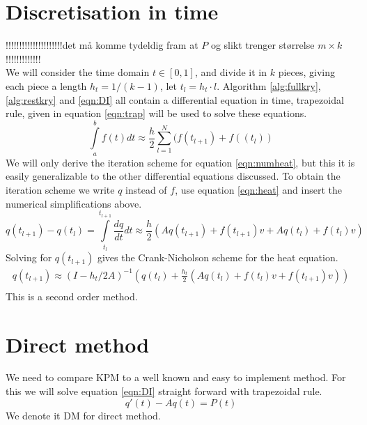 \section{Discretisation in time} \label{sec:time}
!!!!!!!!!!!!!!!!!!!!!det må komme tydeldig fram at $P$ og slikt trenger størrelse $m \times k$ !!!!!!!!!!!!!\\
We will consider the time domain $t \in [0,1] $, and divide it in $k$ pieces, giving each piece a length $h_t = 1/(k-1)$, let $t_l = h_t\cdot l$.
Algorithm \ref{alg:fullkry}, \ref{alg:restkry} and \ref{eqn:DI} all contain a differential equation in time,
trapezoidal rule\cite{trap}, given in equation \eqref{eqn:trap} will be used to solve these equations. 
\begin{equation} \label{eqn:trap}
\int \limits_a^b f(t) dt \approx \frac{h}{2} \sum \limits_{l = 1}^N(f(t_{l+1})+f((t_l))
\end{equation}
We will only derive the iteration scheme for equation \eqref{eqn:numheat}, but 
this it is easily generalizable to the other differential equations discussed.
To obtain the iteration scheme we write $q$ instead of $f$, use equation \eqref{eqn:heat} and insert the numerical simplifications above.
\begin{equation}
q(t_{l+1}) - q(t_l) = \int \limits_{t_l}^{t_{l+1}} \frac{d q}{d t} dt \approx \frac{h}{2}(A q(t_{l+1})+f(t_{l+1})v +A q(t_l)+f(t_l) v) 
\end{equation}
Solving for $q(t_{l+1})$ gives the Crank-Nicholson scheme for the heat equation.
\begin{equation} \label{eqn:trapscheme}
\begin{aligned}
q(t_{l+1}) \approx (I-h_t/2 A)^{-1}(q(t_l) + \frac{h_t}{2}( A q(t_{l}) + f(t_l)v+f(t_{l+1})v))\\
\end{aligned}
\end{equation} 
This is a second order method.
\section{Direct method} \label{sec:DM}
We need to compare KPM to a well known and easy to implement method. For this we will solve equation \eqref{eqn:DI} straight forward with trapezoidal rule.
\begin{equation} \label{eqn:DI}
q'(t) -A q(t) = P(t)
\end{equation}
We denote it DM for direct method.
\newpage
